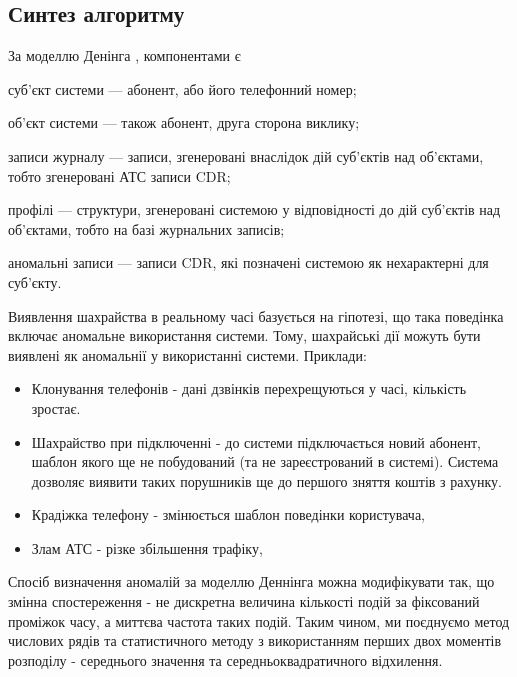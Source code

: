 \newpage
{}
\subsection{Синтез алгоритму}

За моделлю Денінга \cite{denning1987intrusion}, компонентами є  %

\begin{ESKDexplanation}
\item суб'єкт системи --- абонент, або його телефонний номер;
\item об'єкт системи --- також абонент, друга сторона виклику;
\item записи журналу --- записи, згенеровані внаслідок дій суб'єктів над 
      об'єктами, тобто згенеровані АТС записи CDR;
\item профілі --- структури, згенеровані системою у відповідності до дій 
      суб'єктів над об'єктами, тобто на базі журнальних записів;
\item аномальні записи --- записи CDR, які позначені системою як нехарактерні
      для суб'єкту.
\end{ESKDexplanation}

Виявлення шахрайства в реальному часі базується на гіпотезі, що така поведінка 
включає аномальне використання системи. Тому, шахрайські дії можуть бути 
виявлені як аномальнії у використанні системи. Приклади:

\begin{itemize}
  \item Клонування телефонів - дані дзвінків перехрещуються у часі, кількість 
        зростає.
  \item Шахрайство при підключенні - до системи підключається новий абонент, 
        шаблон якого ще не побудований (та не зареєстрований в системі). 
        Система дозволяє виявити таких порушників ще до першого зняття коштів з
         рахунку.
  \item Крадіжка телефону - змінюється шаблон поведінки користувача,
  \item Злам АТС - різке збільшення трафіку,
\end{itemize}

Спосіб визначення аномалій за моделлю Деннінга \cite{denning1987intrusion} можна модифікувати так, що змінна 
спостереження - не дискретна величина кількості подій за 
фіксований проміжок часу, а миттєва частота таких подій. Таким 
чином, ми поєднуємо метод числових рядів та статистичного методу
з використанням перших двох моментів розподілу - середнього 
значення та середньоквадратичного відхилення.

